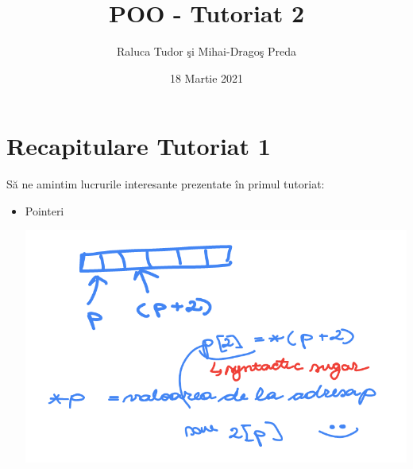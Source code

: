 \documentclass{article}
\title{POO - Tutoriat 2}
\author{Raluca Tudor şi Mihai-Dragoş Preda}
\date{18 Martie 2021}
\begin{document}
\maketitle

\section*{Recapitulare Tutoriat 1}
Să ne amintim lucrurile interesante prezentate în primul tutoriat:

\begin{itemize}
    \item Pointeri 
    
    \includegraphics[scale=0.3]{desen1.png}
\end{itemize}
\end{document}
